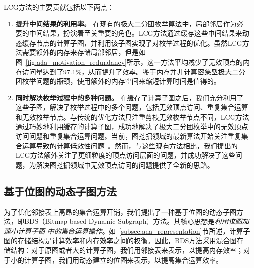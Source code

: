 \begin{example}
\end{example}

LCG方法的主要贡献包括以下两点：

\begin{enumerate}
	\item \textbf{提升中间结果的利用率。}
	在现有的极大二分团枚举算法中，局部邻居作为必要的中间结果，扮演着至关重要的角色。LCG方法通过缓存这些中间结果来动态缓存节点的计算子图，并利用该子图实现了对枚举过程的优化。虽然LCG方法需要额外的内存来存储局部邻居，但是如图~\ref{fig:ada_motivation_redundancy}所示，这一方法平均减少了无效顶点的内存访问量达到了97.1\%，从而提升了效率。鉴于内存并非计算密集型极大二分团枚举问题的瓶颈，使用额外的内存空间来缩短计算时间是值得的。
	


	\item \textbf{同时解决枚举过程中的多种问题。}
	在缓存了计算子图之后，我们充分利用了这些子图，解决了枚举过程中的多个问题，包括无效顶点访问、重复集合运算和无效枚举节点。与传统的优化方法只注重剪枝无效枚举节点不同，LCG方法通过巧妙地利用缓存的计算子图，成功地解决了极大二分团枚举中的无效顶点访问问题和重复集合运算问题。当前，图挖掘领域的最新算法开始关注重复集合运算导致的计算低效性问题~\cite{Graphpi20,GPMredundancy23}。然而，与这些现有方法相比，我们提出的LCG方法额外关注了更细粒度的顶点访问层面的问题，并成功解决了这些问题，为解决图挖掘领域中无效顶点访问的问题提供了全新的思路。

\end{enumerate}



\subsection{基于位图的动态子图方法}
\label{subsec:ada_design_1}

为了优化邻接表上高昂的集合运算开销，我们提出了一种基于位图的动态子图方法，即BDS（Bitmap-based Dynamic Subgraph）方法。其核心思想是\emph{利用位图加速小计算子图} \emph{中的集合运算操作}。如~\ref{subsec:ada_representation}节所述，计算子图的存储结构是计算效率和内存效率之间的权衡。因此，BDS方法采用混合图存储结构：对于原图或者大的计算子图，我们用邻接表来表示，以提高内存效率；对于小的计算子图，我们用动态建立的位图来表示，以提高集合运算效率。

